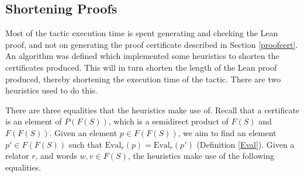 \documentclass[12pt]{article} %
\theoremstyle{definition}
\theoremstyle{definition}
\theoremstyle{definition}
\theoremstyle{definition}
\theoremstyle{definition}
\theoremstyle{definition}
\begin{document}





\subsection{Shortening Proofs}\label{golfsec}

Most of the tactic execution time is spent generating and checking the Lean proof,
and not on generating the proof certificate described in Section \ref{proofcert}.
An algorithm was defined which implemented some heuristics to shorten the certificates
produced. This will in turn shorten the length of the Lean proof
produced, thereby shortening the execution time of the tactic.
There are two heuristics used to do this.

There are three equalities that the heuristics make use of. Recall that
a certificate is an element of $P(F(S))$, which is a semidirect product of $F(S)$
and $F(F(S))$. Given an element $p \in F(F(S))$, we aim to find an element
$p' \in F(F(S))$ such that $\text{Eval}_r(p) = \text{Eval}_r(p')$ (Definition \ref{Eval}).
Given a relator $r$, and words $w, v \in F(S)$, the heuristics make use of the following equalities.
\end{document}
